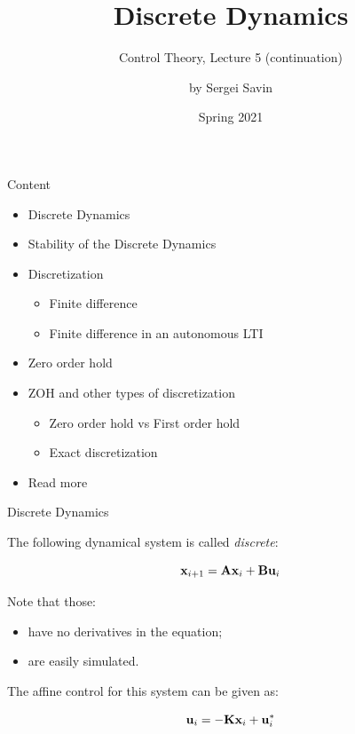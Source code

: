 \documentclass{beamer}
\title{Discrete Dynamics}
\subtitle{Control Theory, Lecture 5 (continuation)}
\author{by Sergei Savin}
\date{Spring 2021}
\begin{document}
\maketitle


\begin{frame}{Content}

\begin{itemize}
\item Discrete Dynamics
\item Stability of the Discrete Dynamics
\item Discretization
\begin{itemize}
    \item Finite difference
    \item Finite difference in an autonomous LTI
\end{itemize}
\item Zero order hold
\item ZOH and other types of discretization
\begin{itemize}
    \item Zero order hold vs First order hold
    \item Exact discretization
\end{itemize}
\item Read more
\end{itemize}

\end{frame}





\begin{frame}{Discrete Dynamics}
\begin{flushleft}

The following dynamical system is called \emph{discrete}:

\begin{equation}
    \mathbf{x}_{i+1} = \mathbf{A}\mathbf{x}_i + \mathbf{B}\mathbf{u}_i
\end{equation}

Note that those:

\begin{itemize}
    \item have no derivatives in the equation;
    \item are easily simulated.
\end{itemize}

\bigskip

The affine control for this system can be given as:

\begin{equation}
    \mathbf{u}_i = -\mathbf{K}\mathbf{x}_i + \mathbf{u}_i^*
\end{equation}

\end{flushleft}
\end{frame}
\end{document}

